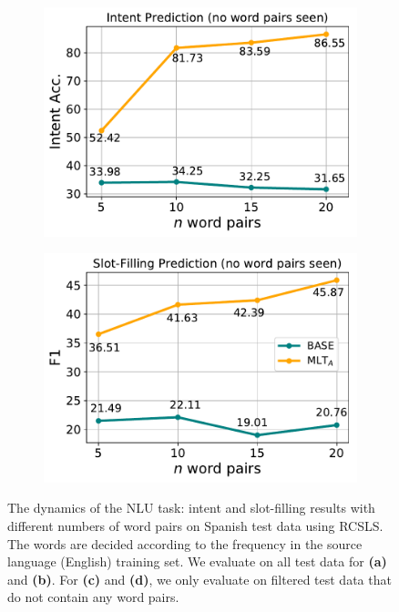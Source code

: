 \documentclass[letterpaper]{article} %
\begin{document}
\begin{figure}[!ht]
\begin{subfigure}{.24\textwidth}
    \includegraphics[scale=0.32]{es_intent2.pdf}
    \caption{}
    \label{fig:intent-es-unseen}
\end{subfigure}
\begin{subfigure}{.24\textwidth}
    \centering
    \includegraphics[scale=0.32]{es_slot2.pdf}
    \caption{}
    \label{fig:slot-es-unseen}
\end{subfigure}
\caption{The dynamics of the NLU task: intent and slot-filling results with different numbers of word pairs on Spanish test data using RCSLS. The words are decided according to the frequency in the source language (English) training set. We evaluate on all test data for \textbf{(a)} and \textbf{(b)}. For \textbf{(c)} and \textbf{(d)}, we only evaluate on filtered test data that do not contain any word pairs.}
\label{fig:dynamics}
\end{figure}
\end{document}
